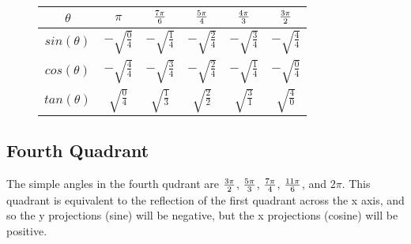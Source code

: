 \begin{figure}[htb]
\begin{center}
\begin{tabular}{ | c | c | c | c | c | c | }
\hline 
$\theta$ & $\pi$ & $\frac{7\pi}{6}$ & $\frac{5\pi}{4}$ & $\frac{4\pi}{3}$ & $\frac{3\pi}{2}$\\
\hline 
$sin(\theta)$ & $-\sqrt{\frac{0}{4}}$ & $-\sqrt{\frac{1}{4}}$ & $-\sqrt{\frac{2}{4}}$ & $-\sqrt{\frac{3}{4}}$ & $-\sqrt{\frac{4}{4}}$\\
\hline 
$cos(\theta)$ & $-\sqrt{\frac{4}{4}}$ & $-\sqrt{\frac{3}{4}}$ & $-\sqrt{\frac{2}{4}}$ & $-\sqrt{\frac{1}{4}}$ & $-\sqrt{\frac{0}{4}}$\\
\hline 
$tan(\theta)$ & $\sqrt{\frac{0}{4}}$ & $\sqrt{\frac{1}{3}}$ & $\sqrt{\frac{2}{2}}$ & $\sqrt{\frac{3}{1}}$ & $\sqrt{\frac{4}{0}}$\\
\hline
\end{tabular}
\end{center}
\end{figure}


\clearpage
\subsection{Fourth Quadrant}
The simple angles in the fourth qudrant are $\frac{3\pi}{2}$, $\frac{5\pi}{3}$, $\frac{7\pi}{4}$, $\frac{11\pi}{6}$, and $2\pi$.  This quadrant is equivalent to the reflection of the first quadrant across the x axis, and so the y projections (sine) will be negative, but the x projections (cosine) will be positive. 

